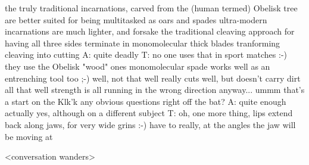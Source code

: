 the truly traditional incarnations, carved from the (human termed) Obelisk tree
are better suited for being multitasked as oars and spades
ultra-modern incarnations are much lighter, and forsake the traditional cleaving approach for having all three sides terminate in monomolecular thick blades
tranforming cleaving into cutting
A: quite deadly
T: no one uses that in sport matches :-)
they use the Obelisk "wood" ones
monomolecular spade works well as an entrenching tool too ;-)
well, not that well really
cuts well, but doesn't carry dirt all that well
strength is all running in the wrong direction
anyway... ummm
that's a start on the Klk'k
any obvious questions right off the bat?
A: quite enough actually
yes, although on a different subject
T: oh, one more thing, lips extend back along jaws, for very wide grins :-)
have to really, at the angles the jaw will be moving at

<conversation wanders>


